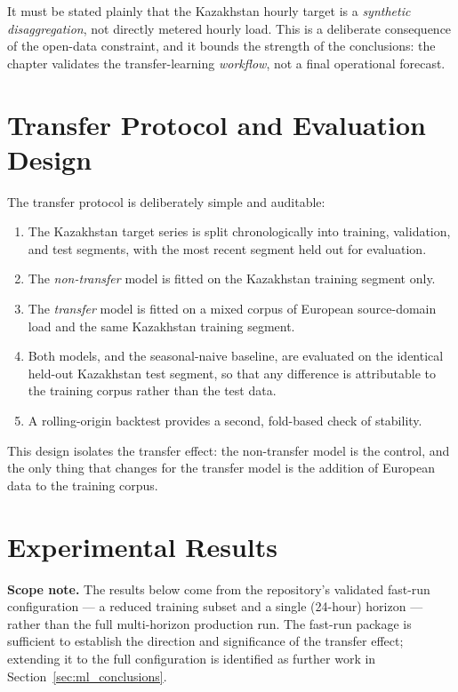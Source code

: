 It must be stated plainly that the Kazakhstan hourly target is a \emph{synthetic disaggregation}, not directly metered hourly load. This is a deliberate consequence of the open-data constraint, and it bounds the strength of the conclusions: the chapter validates the transfer-learning \emph{workflow}, not a final operational forecast.

\section{Transfer Protocol and Evaluation Design}
\label{sec:ml_adapt}

The transfer protocol is deliberately simple and auditable:
\begin{enumerate}
    \item The Kazakhstan target series is split chronologically into training, validation, and test segments, with the most recent segment held out for evaluation.
    \item The \emph{non-transfer} model is fitted on the Kazakhstan training segment only.
    \item The \emph{transfer} model is fitted on a mixed corpus of European source-domain load and the same Kazakhstan training segment.
    \item Both models, and the seasonal-naive baseline, are evaluated on the identical held-out Kazakhstan test segment, so that any difference is attributable to the training corpus rather than the test data.
    \item A rolling-origin backtest provides a second, fold-based check of stability.
\end{enumerate}
This design isolates the transfer effect: the non-transfer model is the control, and the only thing that changes for the transfer model is the addition of European data to the training corpus.

\section{Experimental Results}
\label{sec:ml_results}

\textbf{Scope note.} The results below come from the repository's validated fast-run configuration --- a reduced training subset and a single (24-hour) horizon --- rather than the full multi-horizon production run. The fast-run package is sufficient to establish the direction and significance of the transfer effect; extending it to the full configuration is identified as further work in Section~\ref{sec:ml_conclusions}.

